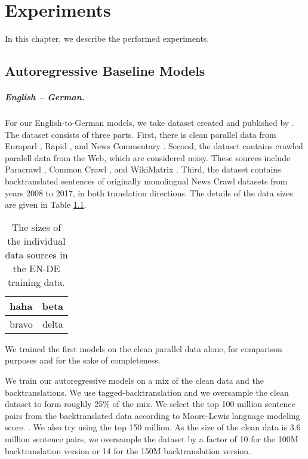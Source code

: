 \chapter{Experiments}
\label{chap:experiments}

In this chapter, we describe the performed experiments. 

\section{Autoregressive Baseline Models}
\label{sec:exp:autoregressive}

\paragraph{English -- German.} For our English-to-German models, we take
dataset created and published by \citet{germann2020university}. The dataset
consists of three parts. First, there is clean parallel data from Europarl
\citep{todo}, Rapid \citep{todo}, and News Commentary \citep{todo}. Second, the
dataset contains crawled paralell data from the Web, which are considered
noisy. These sources include Paracrawl \citep{todo}, Common Crawl \citep{todo},
and WikiMatrix \citep{todo}. Third, the dataset contains backtranslated
sentences of originally monolingual News Crawl datasets from years 2008 to
2017, in both translation directions. The details of the data sizes are given
in Table \ref{tab:ende-data-sizes}.

\begin{table}
  \centering
  \begin{tabular}{cc}
    \toprule
    haha & beta \\
    \midrule
    bravo & delta \\
    \bottomrule
  \end{tabular}

  \caption{The sizes of the individual data sources in the EN-DE training
    data.}%
  \label{tab:ende-data-sizes}
\end{table}

We trained the first models on the clean parallel data alone, for comparison
purposes and for the sake of completeness.


We train our autoregressive models on a mix of the clean data and the
backtranslations. We use tagged-backtranslation and we oversample the clean
dataset to form roughly 25\% of the mix. We select the top 100 million sentence
pairs from the backtranslated data according to Moore-Lewis language modeling
score. . We also try using
the top 150 million.  As the size of the clean data is 3.6
million sentence pairs, we oversample the dataset by a factor of 10 for the 100M
backtranslation version or 14 for the 150M backtranslation version.




